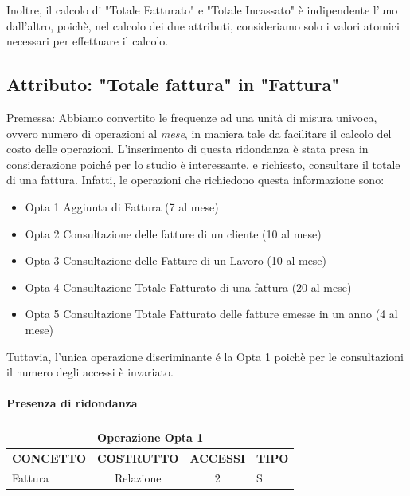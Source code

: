 \documentclass{elegantbook}
\begin{document}
        Inoltre, il calcolo di "Totale Fatturato" e "Totale Incassato" è indipendente l'uno dall'altro, poichè, nel calcolo dei due attributi,
        consideriamo solo i valori atomici necessari per effettuare il calcolo.
        
        \subsection{Attributo: "Totale fattura" in "Fattura"}
        Premessa: Abbiamo convertito le frequenze ad una unità di misura univoca, ovvero numero di operazioni al \textit{mese}, in maniera tale da facilitare il calcolo del costo delle operazioni.
        L'inserimento di questa ridondanza è stata presa in considerazione poiché per lo studio è interessante,
        e richiesto, consultare il totale di una fattura. Infatti, le operazioni che richiedono questa informazione sono:
        \begin{itemize}
            \item Opta 1 Aggiunta di Fattura (7 al mese)
            \item Opta 2 Consultazione delle fatture di un cliente (10 al mese)
            \item Opta 3 Consultazione delle Fatture di un Lavoro (10 al mese)
            \item Opta 4 Consultazione Totale Fatturato di una fattura (20 al mese)
            \item Opta 5 Consultazione Totale Fatturato delle fatture emesse in un anno (4 al mese)
        \end{itemize}
        Tuttavia, l'unica operazione discriminante é la Opta 1 poichè per le consultazioni il numero degli
        accessi è invariato.
        \newcommand\optaOne{7}
        \paragraph{Presenza di ridondanza}
        \begin{table}[H]
            \begin{tabular}{|p{5cm}|c|c|p{5cm}|}
            \hline
            \multicolumn{4}{|c|}{Operazione Opta 1}\\ 
            \hline
            \textbf{CONCETTO} & \textbf{COSTRUTTO} & \textbf{ACCESSI} & \textbf{TIPO} \\
            \hline
                Fattura & Relazione & 2 & S \\
            \hline
            \end{tabular}
        \end{table}
\end{document}

